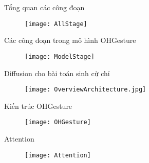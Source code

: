 \begin{frame}{Tổng quan các công đoạn}
	
	\begin{figure}
		\centering
		\texttt{[image: AllStage]}
	\end{figure}
	
\end{frame}

\begin{frame}{Các công đoạn trong mô hình OHGesture}
	\begin{figure}
		\centering
		\texttt{[image: ModelStage]}
	\end{figure}
\end{frame}

\begin{frame}{Diffusion cho bài toán sinh cử chỉ}
	
	\begin{figure}
		\centering
		\texttt{[image: OverviewArchitecture.jpg]}
	\end{figure}
	
\end{frame}

\begin{frame}{Kiến trúc OHGesture}
	\begin{figure}
		\centering
		\texttt{[image: OHGesture]}
	\end{figure}
\end{frame}


\begin{frame}{Attention}
	\begin{figure}
		\centering
		\texttt{[image: Attention]}
	\end{figure}
\end{frame}

